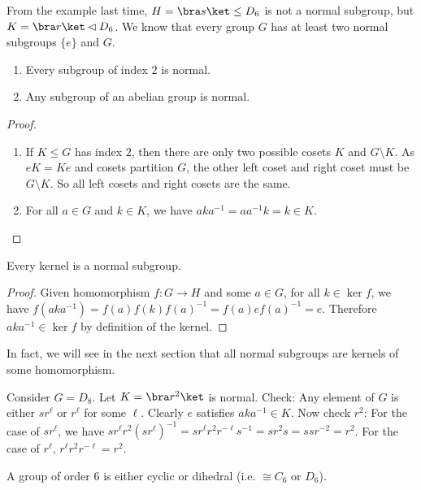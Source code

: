 \documentclass[a4pape]{article}
\begin{document}
From the example last time, $H=\bra s\ket\leq D_6$ is not a normal subgroup, but $K=\bra r\ket \lhd D_6$. We know that every group $G$ has at least two normal subgroups $\{e\}$ and $G$.

\begin{lemma}\leavevmode
  \begin{enumerate}
  \item Every subgroup of index $2$ is normal.
  \item Any subgroup of an abelian group is normal.
  \end{enumerate}
\end{lemma}

\begin{proof}\leavevmode
  \begin{enumerate}
  \item If $K\leq G$ has index $2$, then there are only two possible cosets $K$ and $G\setminus K$. As $eK = Ke$ and cosets partition $G$, the other left coset and right coset must be $G\setminus K$. So all left cosets and right cosets are the same.
  \item For all $a\in G$ and $k\in K$, we have $aka^{-1} = aa^{-1}k = k\in K$.
  \end{enumerate}
\end{proof}
\begin{prop}
  Every kernel is a normal subgroup. 
\end{prop}

\begin{proof}
    Given homomorphism $f:G\rightarrow H$ and some $a\in G$, for all $k\in \ker f$, we have $f(aka^{-1}) = f(a)f(k)f(a)^{-1} = f(a)ef(a)^{-1} = e$. Therefore $aka^{-1}\in\ker f$ by definition of the kernel.
\end{proof}

In fact, we will see in the next section that all normal subgroups are kernels of some homomorphism.

\begin{eg}
  Consider $G = D_8$. Let $K = \bra r^2\ket$ is normal. Check: Any element of $G$ is either $sr^\ell$ or $r^\ell$ for some $\ell$. Clearly $e$ satisfies $aka^{-1}\in K$. Now check $r^2$: For the case of $sr^\ell$, we have $sr^\ell r^2(sr^\ell)^{-1} = sr^\ell r^2 r^{-\ell}s^{-1} = sr^2 s = ssr^{-2} = r^2$. For the case of $r^\ell$, $r^\ell r^2r^{-\ell} = r^2$.
\end{eg}

\begin{prop}
  A group of order $6$ is either cyclic or dihedral (i.e. $\cong C_6$ or $D_6$).
\end{prop}
\end{document}
